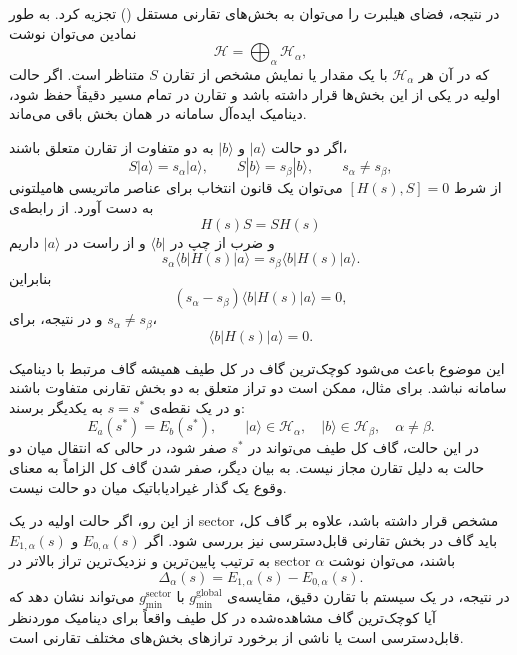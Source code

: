 در نتیجه، فضای هیلبرت را می‌توان به بخش‌های تقارنی مستقل
() تجزیه کرد. به طور نمادین می‌توان نوشت
\begin{equation}
	\mathcal{H}
	=
	\bigoplus_{\alpha}\mathcal{H}_{\alpha},
\end{equation}
که در آن هر $\mathcal{H}_{\alpha}$ با یک مقدار یا نمایش مشخص از
تقارن $S$ متناظر است. اگر حالت اولیه در یکی از این بخش‌ها قرار
داشته باشد و تقارن در تمام مسیر دقیقاً حفظ شود، دینامیک ایده‌آل
سامانه در همان بخش باقی می‌ماند.

اگر دو حالت $|a\rangle$ و $|b\rangle$ به دو  متفاوت از تقارن
متعلق باشند،
\[S|a\rangle=s_{\alpha}|a\rangle,
\qquad
S|b\rangle=s_{\beta}|b\rangle,
\qquad
s_{\alpha}\neq s_{\beta},\]
از شرط $[H(s),S]=0$ می‌توان یک قانون انتخاب برای عناصر ماتریسی
هامیلتونی به دست آورد. از رابطه‌ی
\[H(s)S=S H(s)\]
و ضرب از چپ در $\langle b|$ و از راست در $|a\rangle$ داریم
\[s_{\alpha}\langle b|H(s)|a\rangle
=
s_{\beta}\langle b|H(s)|a\rangle.\]
بنابراین
\begin{equation}
	(s_{\alpha}-s_{\beta})
	\langle b|H(s)|a\rangle=0,
\end{equation}
و در نتیجه، برای $s_{\alpha}\neq s_{\beta}$،
\begin{equation}
	\langle b|H(s)|a\rangle=0.
	\label{eq:symmetry-selection-rule-H}
\end{equation}



این موضوع باعث می‌شود کوچک‌ترین گاف در کل طیف همیشه گاف مرتبط با
دینامیک سامانه نباشد. برای مثال، ممکن است دو تراز متعلق به دو بخش
تقارنی متفاوت باشند و در یک نقطه‌ی $s=s^\ast$ به یکدیگر برسند:
\begin{equation}
	E_a(s^\ast)=E_b(s^\ast),
	\qquad
	|a\rangle\in\mathcal{H}_{\alpha},
	\quad
	|b\rangle\in\mathcal{H}_{\beta},
	\quad
	\alpha\neq\beta.
\end{equation}
در این حالت، گاف کل طیف می‌تواند در $s^\ast$ صفر شود، در حالی که
انتقال میان دو حالت به دلیل تقارن مجاز نیست. به بیان دیگر، صفر شدن
گاف کل الزاماً به معنای وقوع یک گذار غیرادیاباتیک میان دو حالت
نیست.

از این رو، اگر حالت اولیه در یک sector مشخص قرار داشته باشد، علاوه
بر گاف کل، باید گاف در بخش تقارنی قابل‌دسترسی نیز بررسی شود. اگر
$E_{0,\alpha}(s)$ و $E_{1,\alpha}(s)$ به ترتیب پایین‌ترین و
نزدیک‌ترین تراز بالاتر در sector $\alpha$ باشند، می‌توان نوشت
\begin{equation}
	\Delta_{\alpha}(s)
	=
	E_{1,\alpha}(s)-E_{0,\alpha}(s).
	\label{eq:sector-gap}
\end{equation}
در نتیجه، در یک سیستم با تقارن دقیق، مقایسه‌ی
$g_{\min}^{\mathrm{global}}$ با
$g_{\min}^{\mathrm{sector}}$ می‌تواند نشان دهد که آیا کوچک‌ترین
گاف مشاهده‌شده در کل طیف واقعاً برای دینامیک موردنظر قابل‌دسترسی
است یا ناشی از برخورد ترازهای بخش‌های مختلف تقارنی است.

